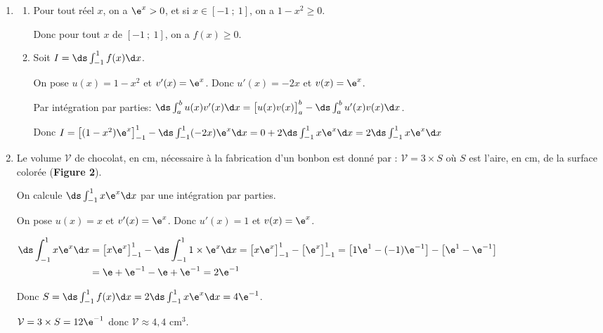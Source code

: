 \begin{enumerate}
\item 
	\begin{enumerate}
		\item %
Pour tout réel $x$, on a $\e^{x}>0$, et si $x\in 	[-1~;~1]$, on a $1-x^2\geqslant 0$. 

Donc pour tout $x$ de $[-1~;~1]$, on a $f(x)\geqslant 0$.
		
		\item %
Soit $I= \ds\int_{-1}^1 f(x) \d x$.

On pose $u(x)=1-x^2$ et $v'(x)=\e^{x}$. Donc $u'(x)=-2x$ et $v(x)=\e^{x}$.

Par intégration par parties: $\ds\int_{a}^{b} u(x)v'(x) \d x = \left [ u(x)v(x)\strut\right ]_{a}^{b} - \ds\int_{a}^{b} u'(x)v(x) \d x$.

Donc $I= \left [ (1-x^2)\e^{x} \strut \right ]_{-1}^{1} - \ds\int_{-1}^{1} (-2x)\e^{x} \d x
= 0+2 \ds\int_{-1}^{1} x\e^{x} \d x =  2\ds\int_{-1}^{1} x\e^{x} \d x$
	\end{enumerate}
	
\item Le volume $\mathcal{V}$ de chocolat, en cm, nécessaire à la fabrication d'un bonbon est donné par :
$\mathcal{V} = 3 \times S$
où $S$ est l'aire, en cm, de la surface colorée (\textbf{Figure 2}).


On calcule $\ds\int_{-1}^{1} x\e^{x} \d x$ par une intégration par parties.

On pose $u(x)=x$ et $v'(x)=\e^{x}$. Donc $u'(x)=1$ et $v(x)=\e^{x}$.

$\begin{aligned}
\ds\int_{-1}^{1} x\e^{x} \d x
& = \left [ x \e^{x} \strut \right ]_{-1}^{1} - \ds\int_{-1}^{1} 1\times \e^{x} \d x
= \left [ x \e^{x} \strut \right ]_{-1}^{1} - \left [  \e^{x} \strut \right ]_{-1}^{1}
= \left [ 1 \e^{1} - (-1)\e^{-1} \strut \right ] -  \left [ \e^{1} - \e^{-1} \strut \right ]\\
& = \e + \e^{-1} -\e +\e^{-1} = 2 \e^{-1}
\end{aligned}$ 

Donc $S = \ds\int_{-1}^{1} f(x) \d x = 2 \ds\int_{-1}^{1} x\e^{x} \d x = 4 \e^{-1}$.

$\mathcal{V} = 3 \times S = 12\e^{-1}$ donc $\mathcal{V} \approx 4,4$ cm$^3$.
\end{enumerate}

